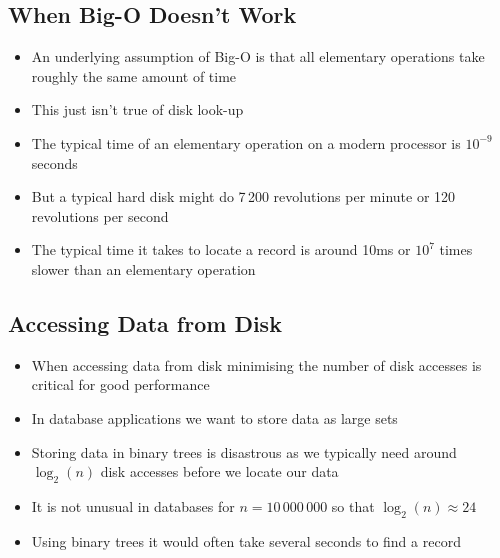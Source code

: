 
\begin{slide}
\section{When Big-O Doesn't Work}

\begin{PauseHighLight}
  \begin{itemize}
  \item An underlying assumption of Big-O is that all elementary
    operations take roughly the same amount of time\pause
  \item This just isn't true of disk look-up\pause
  \item The typical time of an elementary operation on a modern
    processor is $10^{-9}$ seconds\pause
  \item But a typical hard disk might do 7\,200 revolutions per
    minute or 120 revolutions per second\pause
  \item The typical time it takes to locate a record is around 10ms or
    $10^7$ times slower than an elementary operation\pause
  \end{itemize}
\end{PauseHighLight}

\end{slide}


\begin{slide}
\section{Accessing Data from Disk}

\begin{PauseHighLight}
  \begin{itemize}
  \item When accessing data from disk minimising the number of disk
    accesses is critical for good performance\pause
  \item In database applications we want to store data as large
    sets\pause
  \item Storing data in binary trees is disastrous as we typically need
    around $\log_2(n)$ disk accesses before we locate our data\pause
  \item It is not unusual in databases for $n=10\,000\,000$ so that
    $\log_2(n) \approx 24$\pause
  \item Using binary trees it would often take several seconds to find a
    record\pause
  \end{itemize}
\end{PauseHighLight}

\end{slide}

